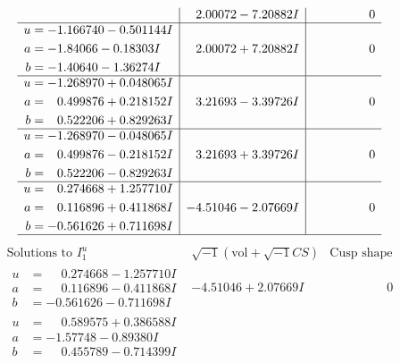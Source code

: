 \documentclass[1p]{elsarticle_modified}
\theoremstyle{definition}
\newcommand{\I}{\sqrt{-1}}
\begin{document}
$$\begin{array}{c|c|c}
 & \phantom{-}2.00072 - 7.20882 I & \phantom{-0.000000 } 0 \\ \hline\begin{aligned}
u &= -1.166740 - 0.501144 I \\
a &= -1.84066 - 0.18303 I \\
b &= -1.40640 - 1.36274 I\end{aligned}
 & \phantom{-}2.00072 + 7.20882 I & \phantom{-0.000000 } 0 \\ \hline\begin{aligned}
u &= -1.268970 + 0.048065 I \\
a &= \phantom{-}0.499876 + 0.218152 I \\
b &= \phantom{-}0.522206 + 0.829263 I\end{aligned}
 & \phantom{-}3.21693 - 3.39726 I & \phantom{-0.000000 } 0 \\ \hline\begin{aligned}
u &= -1.268970 - 0.048065 I \\
a &= \phantom{-}0.499876 - 0.218152 I \\
b &= \phantom{-}0.522206 - 0.829263 I\end{aligned}
 & \phantom{-}3.21693 + 3.39726 I & \phantom{-0.000000 } 0 \\ \hline\begin{aligned}
u &= \phantom{-}0.274668 + 1.257710 I \\
a &= \phantom{-}0.116896 + 0.411868 I \\
b &= -0.561626 + 0.711698 I\end{aligned}
 & -4.51046 - 2.07669 I & \phantom{-0.000000 } 0\\
 \hline 
 \end{array}$$\newpage$$\begin{array}{c|c|c}  
\text{Solutions to }I^u_{1}& \I (\text{vol} + \sqrt{-1}CS) & \text{Cusp shape}\\
 \hline 
\begin{aligned}
u &= \phantom{-}0.274668 - 1.257710 I \\
a &= \phantom{-}0.116896 - 0.411868 I \\
b &= -0.561626 - 0.711698 I\end{aligned}
 & -4.51046 + 2.07669 I & \phantom{-0.000000 } 0 \\ \hline\begin{aligned}
u &= \phantom{-}0.589575 + 0.386588 I \\
a &= -1.57748 - 0.89380 I \\
b &= \phantom{-}0.455789 - 0.714399 I\end{aligned}

\end{array}$$
\end{document}
